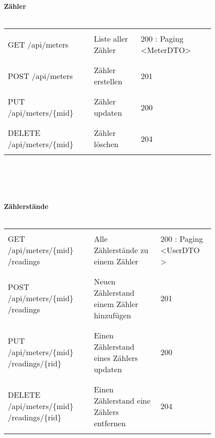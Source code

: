 

\begin{figure}[H]
	\textbf {Zähler} \\ \\
	\begin{tabularx}{\textwidth}{X | X | X}
		\hline \\
		GET 	/api/meters & Liste aller Zähler & 200 : Paging \textless MeterDTO\textgreater \\ \\ \hline
		\\ POST /api/meters & Zähler erstellen & 201\\ \\ \hline
		\\  PUT /api/meters/\{mid\} & Zähler updaten & 200 \\ \\ \hline
		\\ DELETE	/api/meters/\{mid\} & Zähler löschen & 204 \\ \\ \hline
	\end{tabularx}
\\ \\ \\ \\

	\textbf{Zählerstände} \\ \\
	\begin{tabularx}{\textwidth}{X | X | X}
		\hline \\
		GET	/api/meters/\{mid\} /readings & Alle Zählerstände zu einem Zähler & 200 : Paging \textless UserDTO \textgreater \\ \\ \hline
	\\ 	POST /api/meters/\{mid\} /readings & Neuen Zählerstand einem Zähler hinzufügen & 201\\ \\ \hline
	\\	PUT /api/meters/\{mid\} /readings/\{rid\} & Einen Zählerstand eines Zählers updaten & 200 \\ \\ \hline
	\\	DELETE /api/meters/\{mid\} /readings/\{rid\} & Einen Zählerstand eine Zählers entfernen & 204 \\ \\ 
	\end{tabularx}

\end{figure}

